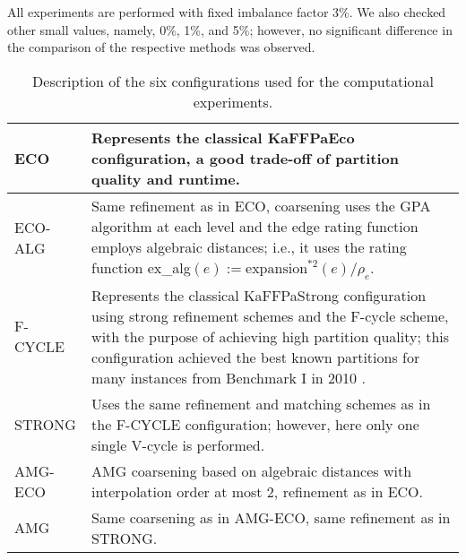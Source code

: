 \documentclass{llncs}
\newcommand{\expansion}{\mathrm{expansion}}
\begin{document}
\par All experiments are performed with fixed imbalance factor 3\%. We also checked other small values, namely, 0\%, 1\%, and 5\%; however, no significant difference in the comparison of the respective methods was observed.
\vfill
     \begin{table}[h!]

        \small

        \vspace{-.25cm}
        \begin{tabularx}{\textwidth}{|l|X|}
        
        \hline
 ECO  &Represents the classical KaFFPaEco configuration, a good trade-off of partition quality and runtime. \\
         \hline
ECO-ALG &  Same refinement as in ECO, coarsening uses the GPA algorithm at each level and the edge rating function employs algebraic distances; i.e., it uses the rating function ex\_alg$(e) := \expansion^{*2}(e)/\rho_e$.  \\
         \hline
F-CYCLE & Represents the classical KaFFPaStrong configuration using strong refinement schemes and the F-cycle scheme, with the purpose of achieving high partition quality; this configuration achieved the best known partitions for many instances from Benchmark I in 2010 \cite{kaffpa}.\\
         \hline
STRONG & Uses the same refinement and matching schemes as in the F-CYCLE configuration; however, here only one single V-cycle is performed. \\
         \hline
AMG-ECO & AMG coarsening based on algebraic distances with interpolation order at most 2, refinement as in ECO. \\
         \hline
AMG & Same coarsening as in AMG-ECO, same refinement as in STRONG.\\
        \hline
        \end{tabularx}
        \vspace{.25cm}
        \caption{Description of the six configurations used for the computational experiments.}
        \label{tab:configurations}
        \vspace{-.75cm}
        \end{table}
\end{document}
